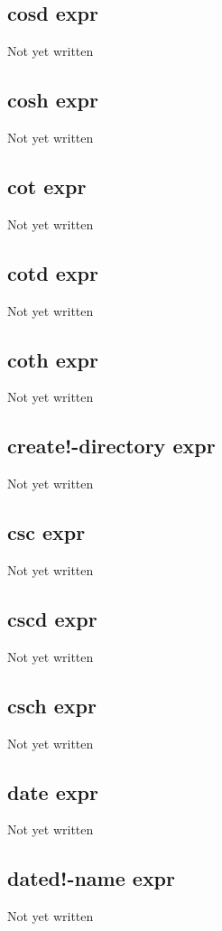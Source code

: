 \documentclass[a4paper,11pt]{article}
\begin{document}
{\subsection{\ttfamily cosd expr}
Not yet written

\subsection{\ttfamily cosh expr}
Not yet written

\subsection{\ttfamily cot expr}
Not yet written

\subsection{\ttfamily cotd expr}
Not yet written

\subsection{\ttfamily coth expr}
Not yet written

\subsection{\ttfamily create!-directory expr}
Not yet written

\subsection{\ttfamily csc expr}
Not yet written

\subsection{\ttfamily cscd expr}
Not yet written

\subsection{\ttfamily csch expr}
Not yet written

\subsection{\ttfamily date expr}
Not yet written

\subsection{\ttfamily dated!-name expr}
Not yet written

}
\end{document}
